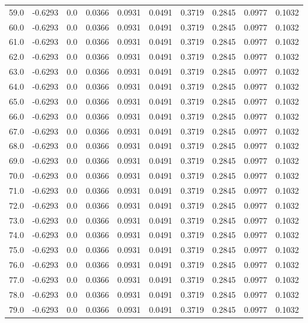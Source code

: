 \begin{longtable}{lrrrrrrrrr}
59.0 & -0.6293 & 0.0 & 0.0366 & 0.0931 & 0.0491 & 0.3719 & 0.2845 & 0.0977 & 0.1032 \\
60.0 & -0.6293 & 0.0 & 0.0366 & 0.0931 & 0.0491 & 0.3719 & 0.2845 & 0.0977 & 0.1032 \\
61.0 & -0.6293 & 0.0 & 0.0366 & 0.0931 & 0.0491 & 0.3719 & 0.2845 & 0.0977 & 0.1032 \\
62.0 & -0.6293 & 0.0 & 0.0366 & 0.0931 & 0.0491 & 0.3719 & 0.2845 & 0.0977 & 0.1032 \\
63.0 & -0.6293 & 0.0 & 0.0366 & 0.0931 & 0.0491 & 0.3719 & 0.2845 & 0.0977 & 0.1032 \\
64.0 & -0.6293 & 0.0 & 0.0366 & 0.0931 & 0.0491 & 0.3719 & 0.2845 & 0.0977 & 0.1032 \\
65.0 & -0.6293 & 0.0 & 0.0366 & 0.0931 & 0.0491 & 0.3719 & 0.2845 & 0.0977 & 0.1032 \\
66.0 & -0.6293 & 0.0 & 0.0366 & 0.0931 & 0.0491 & 0.3719 & 0.2845 & 0.0977 & 0.1032 \\
67.0 & -0.6293 & 0.0 & 0.0366 & 0.0931 & 0.0491 & 0.3719 & 0.2845 & 0.0977 & 0.1032 \\
68.0 & -0.6293 & 0.0 & 0.0366 & 0.0931 & 0.0491 & 0.3719 & 0.2845 & 0.0977 & 0.1032 \\
69.0 & -0.6293 & 0.0 & 0.0366 & 0.0931 & 0.0491 & 0.3719 & 0.2845 & 0.0977 & 0.1032 \\
70.0 & -0.6293 & 0.0 & 0.0366 & 0.0931 & 0.0491 & 0.3719 & 0.2845 & 0.0977 & 0.1032 \\
71.0 & -0.6293 & 0.0 & 0.0366 & 0.0931 & 0.0491 & 0.3719 & 0.2845 & 0.0977 & 0.1032 \\
72.0 & -0.6293 & 0.0 & 0.0366 & 0.0931 & 0.0491 & 0.3719 & 0.2845 & 0.0977 & 0.1032 \\
73.0 & -0.6293 & 0.0 & 0.0366 & 0.0931 & 0.0491 & 0.3719 & 0.2845 & 0.0977 & 0.1032 \\
74.0 & -0.6293 & 0.0 & 0.0366 & 0.0931 & 0.0491 & 0.3719 & 0.2845 & 0.0977 & 0.1032 \\
75.0 & -0.6293 & 0.0 & 0.0366 & 0.0931 & 0.0491 & 0.3719 & 0.2845 & 0.0977 & 0.1032 \\
76.0 & -0.6293 & 0.0 & 0.0366 & 0.0931 & 0.0491 & 0.3719 & 0.2845 & 0.0977 & 0.1032 \\
77.0 & -0.6293 & 0.0 & 0.0366 & 0.0931 & 0.0491 & 0.3719 & 0.2845 & 0.0977 & 0.1032 \\
78.0 & -0.6293 & 0.0 & 0.0366 & 0.0931 & 0.0491 & 0.3719 & 0.2845 & 0.0977 & 0.1032 \\
79.0 & -0.6293 & 0.0 & 0.0366 & 0.0931 & 0.0491 & 0.3719 & 0.2845 & 0.0977 & 0.1032 \\

\end{longtable}
